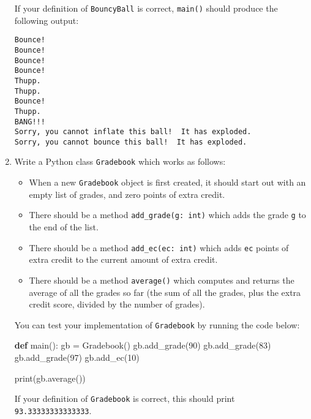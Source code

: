 \documentclass[]{article}
\newenvironment{Shaded}{}{}
\newcommand{\KeywordTok}[1]{\textcolor[rgb]{0.00,0.44,0.13}{\textbf{#1}}}
\newcommand{\DecValTok}[1]{\textcolor[rgb]{0.25,0.63,0.44}{#1}}
\newcommand{\OperatorTok}[1]{\textcolor[rgb]{0.40,0.40,0.40}{#1}}
\newcommand{\BuiltInTok}[1]{#1}
\newcommand{\NormalTok}[1]{#1}
\providecommand{\tightlist}{%
  \setlength{\itemsep}{0pt}\setlength{\parskip}{0pt}}
\begin{document}
\begin{enumerate}
  If your definition of \texttt{BouncyBall} is correct, \texttt{main()}
  should produce the following output:

\begin{verbatim}
Bounce!
Bounce!
Bounce!
Bounce!
Thupp.
Thupp.
Bounce!
Thupp.
BANG!!!
Sorry, you cannot inflate this ball!  It has exploded.
Sorry, you cannot bounce this ball!  It has exploded.
\end{verbatim}
\item
  Write a Python class \texttt{Gradebook} which works as follows:

  \begin{itemize}
  \tightlist
  \item
    When a new \texttt{Gradebook} object is first created, it should
    start out with an empty list of grades, and zero points of extra
    credit.
  \item
    There should be a method \texttt{add\_grade(g:\ int)} which adds the
    grade \texttt{g} to the end of the list.
  \item
    There should be a method \texttt{add\_ec(ec:\ int)} which adds
    \texttt{ec} points of extra credit to the current amount of extra
    credit.
  \item
    There should be a method \texttt{average()} which computes and
    returns the average of all the grades so far (the sum of all the
    grades, plus the extra credit score, divided by the number of
    grades).
  \end{itemize}

  You can test your implementation of \texttt{Gradebook} by running the
  code below:

\begin{Shaded}
\begin{Highlighting}[]
\KeywordTok{def}\NormalTok{ main():}
\NormalTok{gb }\OperatorTok{=}\NormalTok{ Gradebook()}
\NormalTok{gb.add_grade(}\DecValTok{90}\NormalTok{)}
\NormalTok{gb.add_grade(}\DecValTok{83}\NormalTok{)}
\NormalTok{gb.add_grade(}\DecValTok{97}\NormalTok{)}
\NormalTok{gb.add_ec(}\DecValTok{10}\NormalTok{)}

\BuiltInTok{print}\NormalTok{(gb.average())}
\end{Highlighting}
\end{Shaded}

  If your definition of \texttt{Gradebook} is correct, this should print
  \texttt{93.33333333333333}.
\end{enumerate}
\end{document}
